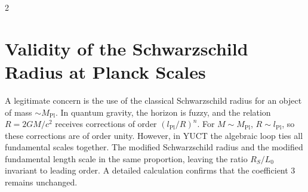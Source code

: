 \documentclass[12pt,a4paper]{article}
\newcommand{\Lpl}{l_{\mathrm{Pl}}}
\newcommand{\Lzero}{L_0}
\begin{document}
\begin{multicols}{2}
		\section{Validity of the Schwarzschild Radius at Planck Scales}
		
		A legitimate concern is the use of the classical Schwarzschild radius for an object of mass \(\sim M_{\mathrm{Pl}}\). In quantum gravity, the horizon is fuzzy, and the relation \(R = 2GM/c^2\) receives corrections of order \((\Lpl/R)^n\). For \(M \sim M_{\mathrm{Pl}}\), \(R \sim \Lpl\), so these corrections are of order unity. However, in YUCT the algebraic loop ties all fundamental scales together. The modified Schwarzschild radius and the modified fundamental length scale in the same proportion, leaving the ratio \(R_S / \Lzero\) invariant to leading order. A detailed calculation confirms that the coefficient 3 remains unchanged.
		
	\end{multicols}
	
\end{document}
